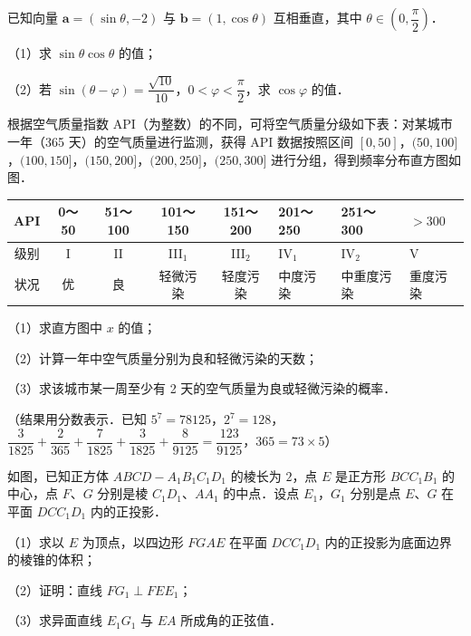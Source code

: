 \begin{question}
已知向量 $\boldsymbol a=(\sin\theta,-2)$ 与 $\boldsymbol b=(1,\cos\theta)$ 互相垂直，其中 $\theta\in\left(0,\dfrac{\pi}{2}\right)$．

（1）求 $\sin\theta\cos\theta$ 的值；

（2）若 $\sin(\theta-\varphi)=\dfrac{\sqrt{10}}{10}$，$0<\varphi<\dfrac{\pi}{2}$，求 $\cos\varphi$ 的值．

\Needspace{0.4\textheight}
\end{question}
\begingroup
\renewenvironment{question}{\Needspace{0.5\textheight}}{}
\begin{question}
根据空气质量指数 API（为整数）的不同，可将空气质量分级如下表：对某城市一年（365 天）的空气质量进行监测，获得 API 数据按照区间 $[0,50]$，$(50,100]$，$(100,150]$，$(150,200]$，$(200,250]$，$(250,300]$ 进行分组，得到频率分布直方图如图．

\begin{center}
\begingroup\setlength{\tabcolsep}{4pt}
\begin{tabular}{ccccclll}
\toprule
API & 0～50 & 51～100 & 101～150 & 151～200 & 201～250 & 251～300 & $>300$ \\
\midrule
级别 & I & II & III$_1$ & III$_2$ & IV$_1$ & IV$_2$ & V \\
状况 & 优 & 良 & 轻微污染 & 轻度污染 & 中度污染 & 中重度污染 & 重度污染 \\
\bottomrule
\end{tabular}
\endgroup
\end{center}

（1）求直方图中 $x$ 的值；

（2）计算一年中空气质量分别为良和轻微污染的天数；

（3）求该城市某一周至少有 2 天的空气质量为良或轻微污染的概率．

（结果用分数表示．已知 $5^7=78125$，$2^7=128$，$\dfrac{3}{1825}+\dfrac{2}{365}+\dfrac{7}{1825}+\dfrac{3}{1825}+\dfrac{8}{9125}=\dfrac{123}{9125}$，$365=73\times5$）
\nopagebreak[4]
\begin{center}\end{center}
\nopagebreak[4]
\Needspace{0.4\textheight}
\end{question}
\endgroup
\begingroup
\renewenvironment{question}{\Needspace{0.5\textheight}}{}
\begin{question}
如图，已知正方体 $ABCD-A_1B_1C_1D_1$ 的棱长为 $2$，点 $E$ 是正方形 $BCC_1B_1$ 的中心，点 $F$、$G$ 分别是棱 $C_1D_1$、$AA_1$ 的中点．设点 $E_1$，$G_1$ 分别是点 $E$、$G$ 在平面 $DCC_1D_1$ 内的正投影．

（1）求以 $E$ 为顶点，以四边形 $FGAE$ 在平面 $DCC_1D_1$ 内的正投影为底面边界的棱锥的体积；

（2）证明：直线 $FG_1\perp FEE_1$；

（3）求异面直线 $E_1G_1$ 与 $EA$ 所成角的正弦值．
\nopagebreak[4]
\begin{center}\end{center}
\nopagebreak[4]
\end{question}
